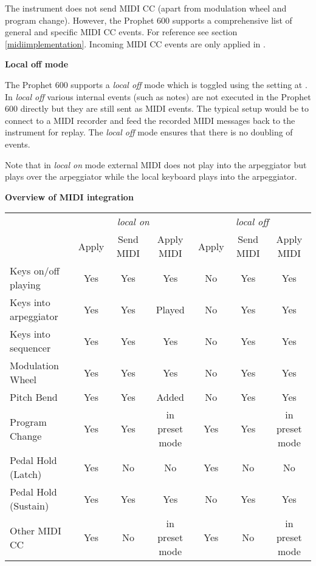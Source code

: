The instrument does not send MIDI CC (apart from modulation wheel and program change). However, the Prophet 600 supports a comprehensive list of general and specific MIDI CC events. For reference see section \ref{midiimplementation}. Incoming MIDI CC events are only applied in \presetmode.

\textbf{Local off mode}

The Prophet 600 supports a \textit{local off} mode which is toggled using the setting at . In \textit{local off} various internal events (such as notes) are not executed in the Prophet 600 directly but they are still sent as MIDI events. The typical setup would be to connect to a MIDI recorder and feed the recorded MIDI messages back to the instrument for replay. The \textit{local off} mode ensures that there is no doubling of events.

Note that in \textit{local on} mode external MIDI does not play into the arpeggiator but plays over the arpeggiator while the local keyboard plays into the arpeggiator.

\textbf{Overview of MIDI integration}

\begin{table}[H]
  \begin{tabular}{lcccccc}
     &
      \multicolumn{3}{c}{\textit{local on}} &
      \multicolumn{3}{c}{\textit{local off}} \\   \cline{2-7} 
    & Apply & Send MIDI & Apply MIDI & Apply & Send MIDI & Apply MIDI \\
    \hline
      \vline Keys on/off playing	& Yes & Yes	& Yes & No & Yes & Yes \\
      Keys into arpeggiator	& Yes & Yes	& Played & No & Yes & Yes \\
      Keys into sequencer	& Yes & Yes	& Yes & No & Yes & Yes \\
      Modulation Wheel	& Yes & Yes	& Yes & No & Yes & Yes \\
      Pitch Bend	& Yes & Yes	& Added & No & Yes & Yes \\
      Program Change	& Yes & Yes	& in preset mode & Yes & Yes & in preset mode \\
      Pedal Hold (Latch)	& Yes & No & No & Yes & No & No \\
      Pedal Hold (Sustain)	& Yes & Yes & Yes & No & Yes & Yes \\
      Other MIDI CC	& Yes & No & in preset mode & Yes & No & in preset mode \\
  \end{tabular}
\end{table}
